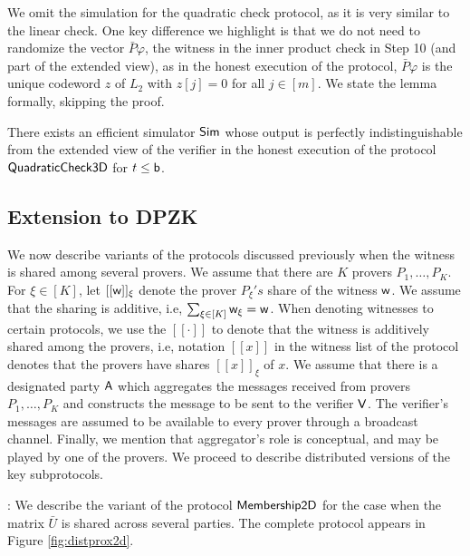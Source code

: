 We omit the simulation for the quadratic check protocol, as it is very similar
to the linear check. One key difference we highlight is that we do not need to
randomize the vector $\bar{P}\varphi$, the witness in the inner product check in
Step 10 (and part of the extended view), as in the honest execution of the
protocol, $\bar{P}\varphi$ is the unique codeword $z$ of $L_2$ with $z[j]=0$ for
all $j\in [m]$. We state the lemma formally, skipping the proof.

\begin{lemma}\label{lem:simquadcheck}
There exists an efficient simulator $\mathsf{Sim}$ whose output is perfectly
indistinguishable from the extended view of the verifier in the honest execution
of the protocol $\mathsf{QuadraticCheck3D}$ for $t\leq \mathsf{b}$.
\end{lemma}


\subsection{Extension to DPZK}
We now describe variants of the protocols discussed previously when the witness
is shared among several provers. We assume that there are $K$ provers
$P_1,\ldots,P_K$. For $\xi\in [K ]$, let $[[\mathsf{w}]]_\xi$ denote the prover
$P_{\xi}'s$ share of the witness $\mathsf{w}$. We assume that the sharing is additive,
i.e, $\sum_{\xi\in [K]}\mathsf{w}_\xi=\mathsf{w}$. When denoting witnesses to certain
protocols, we use the $[[\cdot]]$ to denote that the witness is additively
shared among the provers, i.e, notation $[[x]]$ in the witness list of the
protocol denotes that the provers have shares $[[x]]_\xi$ of $x$. We assume that
there is a designated party $\mathsf{A}$ which aggregates the messages received from
provers $P_1,\ldots,P_K$ and constructs the message to be sent to the verifier
$\mathsf{V}$. The verifier's  messages are assumed to be available to every
prover through a broadcast channel. Finally, we mention that aggregator's role
is conceptual, and may be played by one of the provers. We proceed to describe
distributed versions of the key subprotocols.\smallskip
{}

: We describe the variant of the
protocol $\mathsf{Membership2D}$ for the case when the matrix $\bar{U}$ is shared
across several parties. The complete protocol appears in Figure
\ref{fig:distprox2d}. \smallskip

